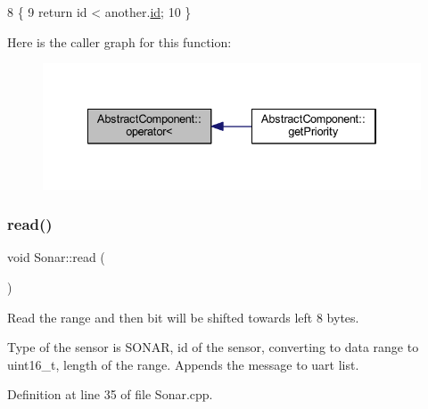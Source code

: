\begin{DoxyCode}
8                                                                         \{
9     \textcolor{keywordflow}{return} \textcolor{keywordtype}{id} < another.\hyperlink{class_abstract_component_a9c9c548149681b1a1dd935e66ed5dd11}{id};
10 \}
\end{DoxyCode}
Here is the caller graph for this function\+:\nopagebreak
\begin{figure}[H]
\begin{center}
\leavevmode
\includegraphics[width=334pt]{class_abstract_component_a0c2e458144111c5f599c66f168516abc_icgraph}
\end{center}
\end{figure}
\mbox{\label{class_sonar_af7a8bb36d925d164b31ff271f9006dc7}} 
\subsubsection{\texorpdfstring{read()}{read()}}
{\footnotesize\ttfamily void Sonar\+::read (\begin{DoxyParamCaption}{ }\end{DoxyParamCaption})\hspace{0.3cm}{\ttfamily [private]}}



Read the range and then bit will be shifted towards left 8 bytes. 

Type of the sensor is S\+O\+N\+AR, id of the sensor, converting to data range to uint16\+\_\+t, length of the range. Appends the message to uart list. 

Definition at line 35 of file Sonar.\+cpp.


